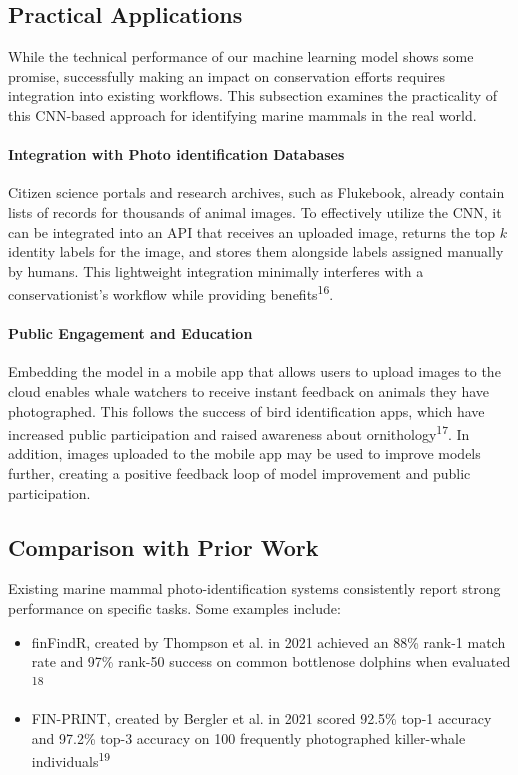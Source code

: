 \documentclass[twocolumn]{article}
\begin{document}
\subsection{Practical Applications}

While the technical performance of our machine learning model shows some promise, successfully making an impact on conservation efforts requires integration into existing workflows. This subsection examines the practicality of this CNN-based approach for identifying marine mammals in the real world.

\paragraph{Integration with Photo identification Databases}

Citizen science portals and research archives, such as Flukebook, already contain lists of records for thousands of animal images. To effectively utilize the CNN, it can be integrated into an API that receives an uploaded image, returns the top $k$ identity labels for the image, and stores them alongside labels assigned manually by humans. This lightweight integration minimally interferes with a conservationist's workflow while providing benefits\textsuperscript{16}.

\paragraph{Public Engagement and Education}

Embedding the model in a mobile app that allows users to upload images to the cloud enables whale watchers to receive instant feedback on animals they have photographed. This follows the success of bird identification apps, which have increased public participation and raised awareness about ornithology\textsuperscript{17}.  In addition, images uploaded to the mobile app may be used to improve models further, creating a positive feedback loop of model improvement and public participation.

\subsection{Comparison with Prior Work}

Existing marine mammal photo-identification systems consistently report strong performance on specific tasks. Some examples include: 
\begin{itemize}
    \item finFindR, created by Thompson et al. in 2021 achieved an 88\% rank-1 match rate and 97\% rank-50 success on common bottlenose dolphins when evaluated \textsuperscript{18}
    \item FIN-PRINT, created by Bergler et al. in 2021 scored 92.5\% top-1 accuracy and 97.2\% top-3 accuracy on 100 frequently photographed killer-whale individuals\textsuperscript{19}
\end{itemize}
\end{document}
